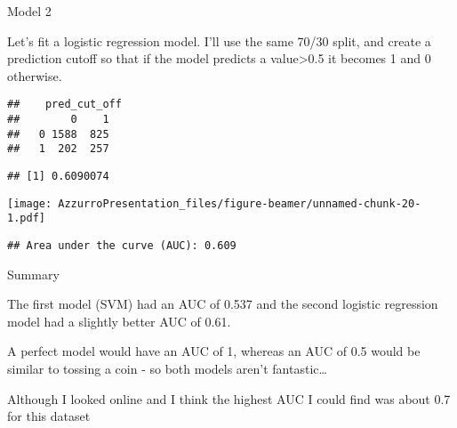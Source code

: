 \documentclass[ignorenonframetext,]{beamer}
\newenvironment{Shaded}{\begin{snugshade}}{\end{snugshade}}
\newcommand{\KeywordTok}[1]{\textcolor[rgb]{0.13,0.29,0.53}{\textbf{{#1}}}}
\newcommand{\DataTypeTok}[1]{\textcolor[rgb]{0.13,0.29,0.53}{{#1}}}
\newcommand{\StringTok}[1]{\textcolor[rgb]{0.31,0.60,0.02}{{#1}}}
\newcommand{\CommentTok}[1]{\textcolor[rgb]{0.56,0.35,0.01}{\textit{{#1}}}}
\newcommand{\NormalTok}[1]{{#1}}
\begin{document}
\begin{frame}[fragile]{Model 2}

Let's fit a logistic regression model. I'll use the same 70/30 split,
and create a prediction cutoff so that if the model predicts a
value\textgreater{}0.5 it becomes 1 and 0 otherwise.

\begin{Shaded}
\end{Shaded}

\begin{verbatim}
##    pred_cut_off
##        0    1
##   0 1588  825
##   1  202  257
\end{verbatim}

\end{frame}

\begin{frame}[fragile]

\begin{verbatim}
## [1] 0.6090074
\end{verbatim}

\begin{Shaded}
\end{Shaded}

\texttt{[image: AzzurroPresentation\_files/figure-beamer/unnamed-chunk-20-1.pdf]}

\begin{verbatim}
## Area under the curve (AUC): 0.609
\end{verbatim}

\end{frame}

\begin{frame}{Summary}

The first model (SVM) had an AUC of 0.537 and the second logistic
regression model had a slightly better AUC of 0.61.

A perfect model would have an AUC of 1, whereas an AUC of 0.5 would be
similar to tossing a coin - so both models aren't fantastic\ldots{}

Although I looked online and I think the highest AUC I could find was
about 0.7 for this dataset

\end{frame}
\end{document}
